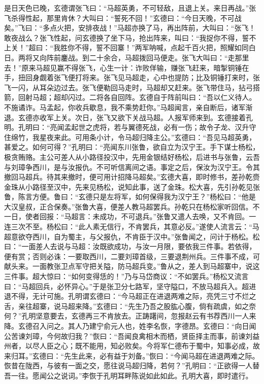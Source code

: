 是日天色已晚，玄德谓张飞曰：“马超英勇，不可轻敌，且退上关。来日再战。”张飞杀得性起，那里肯休？大叫曰：“誓死不回！”玄德曰：“今日天晚，不可战矣。”飞曰：“多点火把，安排夜战！”马超亦换了马，再出阵前，大叫曰：“张飞！敢夜战么？张飞性起，问玄德换了坐下马，抢出阵来，叫曰：“我捉你不得，誓不上关！”超曰：“我胜你不得，誓不回寨！”两军呐喊，点起千百火把，照耀如同白日。两将又向阵前鏖战。到二十余合，马超拨回马便走。张飞大叫曰：“走那里去！”原来马超见赢不得张飞，心生一计：诈败佯输，赚张飞赶来，暗掣铜锤在手，扭回身觑着张飞便打将来。张飞见马超走，心中也提防；比及铜锤打来时，张飞一闪，从耳朵边过去。张飞便勒回马走时，马超却又赶来。张飞带住马，拈弓搭箭，回射马超；超却闪过。二将各自回阵。玄德自于阵前叫曰：“吾以仁义待人。不施谲诈。马孟起，你收兵歇息，我不乘势赶你。”马超闻言，亲自断后，诸军渐退。玄德亦收军上关。次日，张飞又欲下关战马超。人报军师来到。玄德接着孔明。孔明曰：“亮闻孟起世之虎将，若与翼德死战，必有一伤；故令子龙、汉升守住绵竹，我星夜来此。可用条小计，令马超归降主公。”玄德曰：“吾见马超英勇，甚爱之。如何可得？”孔明曰：“亮闻东川张鲁，欲自立为汉宁王。手下谋士杨松，极贪贿赂。主公可差人从小路径投汉中，先用金银结好杨松，后进书与张鲁，云吾与刘璋争西川，是与汝报仇。不可听信离间之语。事定之后，保汝为汉宁王。令其撤回马超兵。待其来撤时，便可用计招降马超矣。”玄德大喜，即时修书，差孙乾赍金珠从小路径至汉中，先来见杨松，说知此事，送了金珠。松大喜，先引孙乾见张鲁，陈言方便。鲁曰：“玄德只是左将军，如何保得我为汉宁王？”杨松曰：“他是大汉皇叔，正合保奏。”张鲁大喜，便差人教马超罢兵。孙乾只在杨松家听回信。不一日，使者回报：“马超言：未成功，不可退兵。”张鲁又遣人去唤，又不肯回。一连三次不至。杨松曰：“此人素无信行，不肯罢兵，其意必反。”遂使人流言云：“马超意欲夺西川，自为蜀主，与父报仇，不肯臣于汉中。”张鲁闻之，问计于杨松。松曰：“一面差人去说与马超：汝既欲成功，与汝一月限，要依我三件事。若依得，便有赏；否则必诛：一要取西川，二要刘璋首级，三要退荆州兵。三件事不成，可献头来。一面教张卫点军守把关隘，防马超兵变。”鲁从之，差人到马超寨中，说这三件事。超大惊曰：“如何变得恁的！”乃与马岱商议：“不如罢兵。”杨松又流言曰：“马超回兵，必怀异心。”于是张卫分七路军，坚守隘口，不放马超兵入。超进退不得，无计可施。孔明谓玄德曰：“今马超正在进退两难之际，亮凭三寸不烂之舌，亲往超寨，说马超来降。”玄德曰：“先生乃吾之股肱心腹，倘有疏虞，如之奈何？”孔明坚意要去，玄德再三不肯放去。正踌躇间，忽报赵云有书荐西川一人来降。玄德召入问之。其人乃建宁俞元人也，姓李名恢，字德昂。玄德曰：“向日闻公苦谏刘璋，今何故归我？”恢曰：“吾闻良禽相木而栖，贤臣择主而事，前谏刘益州者，以尽人臣之心；既不能用，知必败矣。今将军仁德布于蜀中，知事必成，故来归耳。”玄德曰：“先生此来，必有益于刘备。”恢曰：“今闻马超在进退两难之际。恢昔在陇西，与彼有一面之交，愿往说马超归降，若何？”孔明曰：“正欲得一人替吾一往。愿闻公之说词。”李恢于孔明耳畔陈说如此如此。孔明大喜，即时遣行。

